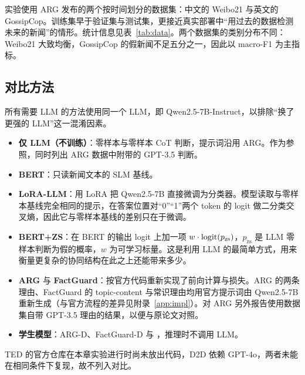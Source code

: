 实验使用 ARG\citep{hu2024bad} 发布的两个按时间划分的数据集：中文的 Weibo21\citep{nan2021mdfend} 与英文的 GossipCop\citep{shu2020fakenewsnet}。训练集早于验证集与测试集，更接近真实部署中“用过去的数据检测未来的新闻”的情形。统计信息见表~\ref{tab:data}。两个数据集的类别分布不同：Weibo21 大致均衡，GossipCop 的假新闻不足五分之一，因此以 macro-F1 为主指标。

\begin{table}[htbp]
\centering\small
\caption{数据集统计}\label{tab:data}
\end{table}

\subsection{对比方法}

所有需要 LLM 的方法使用同一个 LLM，即 Qwen2.5-7B-Instruct\citep{qwen25}，以排除“换了更强的 LLM”这一混淆因素。

\begin{itemize}
\item \textbf{仅 LLM（不训练）}：零样本与零样本 CoT\citep{kojima2022large} 判断，提示词沿用 ARG。作为参照，同时列出 ARG 数据中附带的 GPT-3.5 判断。
\item \textbf{BERT}\citep{devlin2019bert}：只读新闻文本的 SLM 基线。
\item \textbf{LoRA-LLM}：用 LoRA\citep{hu2022lora} 把 Qwen2.5-7B 直接微调为分类器。模型读取与零样本基线完全相同的提示，在答案位置对“0”“1”两个 token 的 logit 做二分类交叉熵，因此它与零样本基线的差别只在于微调。
\item \textbf{BERT+ZS}：在 BERT 的输出 logit 上加一项 $w\cdot\operatorname{logit}(p_{\mathrm{zs}})$，$p_{\mathrm{zs}}$ 是 LLM 零样本判断为假的概率，$w$ 为可学习标量。这是利用 LLM 的最简单方式，用来衡量更复杂的协同结构在此之上还能带来多少。
\item \textbf{ARG}\citep{hu2024bad} 与 \textbf{FactGuard}\citep{he2026factguard}：按官方代码重新实现了前向计算与损失。ARG 的两条理由、FactGuard 的 topic-content 与常识理由均用官方提示词由 Qwen2.5-7B 重新生成（与官方流程的差异见附录~\ref{app:impl}）。对 ARG 另外报告使用数据集自带 GPT-3.5 理由的结果，以便与原论文对照。
\item \textbf{学生模型}：ARG-D、FactGuard-D 与 \student{}，推理时不调用 LLM。
\end{itemize}
TED\citep{liu2025ted} 的官方仓库在本章实验进行时尚未放出代码，D2D\citep{han2025d2d} 依赖 GPT-4o，两者未能在相同条件下复现，故不列入对比。

